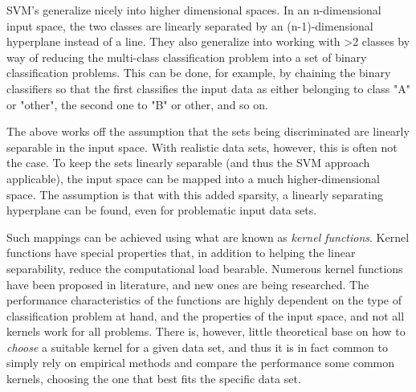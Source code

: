 \documentclass{netsec2012}
\begin{document}
\label{ref:multiclasssvm}

SVM's generalize nicely into higher dimensional spaces.  In an n-dimensional input space, the two
classes are linearly separated by an (n-1)-dimensional hyperplane instead of a line.  They also
generalize into working with >2 classes by way of reducing the multi-class classification problem
into a set of binary classification problems.  This can be done, for example, by chaining the binary
classifiers so that the first classifies the input data as either belonging to class "A" or "other",
the second one to "B" or other, and so on. \cite{duan2005best}

The above works off the assumption that the sets being discriminated are linearly separable in the
input space.  With realistic data sets, however, this is often not the case.  To keep the sets
linearly separable (and thus the SVM approach applicable), the input space can be mapped into a much
higher-dimensional space.  The assumption is that with this added sparsity, a linearly separating
hyperplane can be found, even for problematic input data sets. \cite{svm_chemistry}

Such mappings can be achieved using what are known as \emph{kernel functions}.  Kernel functions
have special properties that, in addition to helping the linear separability, reduce the
computational load bearable.  Numerous kernel functions have been proposed in literature, and new
ones are being researched.  The performance characteristics of the functions are highly dependent on
the type of classification problem at hand, and the properties of the input space, and not all
kernels work for all problems.  There is, however, little theoretical base on how to \emph{choose} a
suitable kernel for a given data set, and thus it is in fact common to simply rely on empirical
methods and compare the performance some common kernels, choosing the one that best fits the
specific data set. \cite{svm_chemistry}

%
%
%
\end{document}
